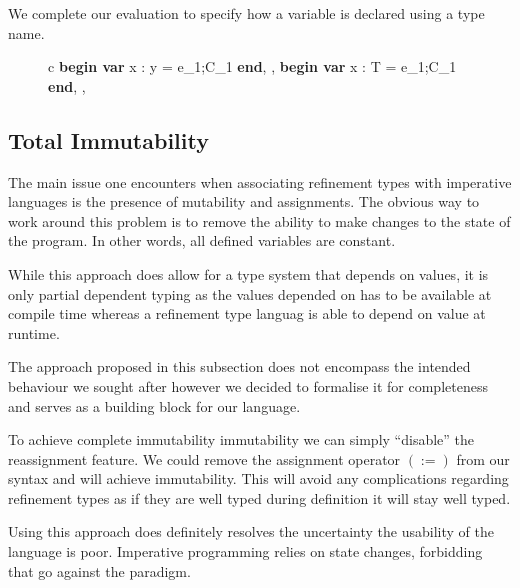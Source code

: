 \documentclass[a4paper,12pt]{report}
\begin{document}
\par
We complete our evaluation to specify how a variable is declared using a type 
name. 

\begin{figure}[H]
  \begin{center}
    \begin{tabular} {c}
      {\langle\textbf{begin var }x : y = e_1;C_1\textbf{ end}, \sigma, \tau \rangle 
      \longrightarrow \langle\textbf{begin var }x : T = e_1;C_1\textbf{ end}, \sigma, \tau \rangle }
    \end{tabular}
  \end{center}
\end{figure}

\subsection{Total Immutability}
The main issue one encounters when associating refinement types with imperative 
languages is the presence of mutability and assignments. The obvious way to 
work around this problem is to remove the ability to make changes to the state 
of the program. In other words, all defined variables are constant. 

\par
While this approach does allow for a type system that depends on values, it is 
only partial dependent typing as the values depended on has to be available at 
compile time whereas a refinement type languag is able to depend on 
value at runtime.

\par
The approach proposed in this subsection does not encompass the intended behaviour we 
sought after however we decided to formalise it for completeness and serves as 
a building block for our language. 

\par
To achieve complete immutability immutability we can simply ``disable'' the 
reassignment feature. We could remove the assignment operator $(:=)$ from our 
syntax and will achieve immutability. This will avoid any complications 
regarding refinement types as 
if they are well typed during definition it will stay well typed. 

\par
Using this approach does definitely resolves the uncertainty the usability of 
the language is poor. Imperative programming relies on state changes, forbidding 
that go against the paradigm. 
\end{document}
